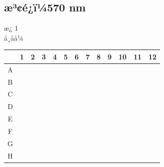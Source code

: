 \documentclass[UTF8,10pt,a4paper,fontset=fandol]{ctexart}
\begin{document}
\subsection*{æ³¢é¿ï¼570 nm}

\noindent
æ¿ 1\\
å¸åå¼

\begin{center}
\scriptsize
\begin{tabular}{c|*{12}{p{0.52cm}|}}
 & 1 & 2 & 3 & 4 & 5 & 6 & 7 & 8 & 9 & 10 & 11 & 12\\ \hline
A & & & &
\parbox[t]{0.5cm}{} &
\parbox[t]{0.5cm}{} &
\parbox[t]{0.5cm}{} &
\parbox[t]{0.5cm}{} &
\parbox[t]{0.5cm}{} &
\parbox[t]{0.5cm}{} &
& & \\ \hline
B & & & &
\parbox[t]{0.5cm}{} &
\parbox[t]{0.5cm}{} &
\parbox[t]{0.5cm}{} &
\parbox[t]{0.5cm}{} &
\parbox[t]{0.5cm}{} &
\parbox[t]{0.5cm}{} &
& & \\ \hline
C & & & &
\parbox[t]{0.5cm}{} &
\parbox[t]{0.5cm}{} &
\parbox[t]{0.5cm}{} &
\parbox[t]{0.5cm}{} &
\parbox[t]{0.5cm}{} &
\parbox[t]{0.5cm}{} &
& & \\ \hline
D & & & &
\parbox[t]{0.5cm}{} &
\parbox[t]{0.5cm}{} &
\parbox[t]{0.5cm}{} &
\parbox[t]{0.5cm}{} &
\parbox[t]{0.5cm}{} &
\parbox[t]{0.5cm}{} &
& & \\ \hline
E & & & &
\parbox[t]{0.5cm}{} &
\parbox[t]{0.5cm}{} &
\parbox[t]{0.5cm}{} &
\parbox[t]{0.5cm}{} &
\parbox[t]{0.5cm}{} &
\parbox[t]{0.5cm}{} &
& & \\ \hline
F & & & &
\parbox[t]{0.5cm}{} &
\parbox[t]{0.5cm}{} &
\parbox[t]{0.5cm}{} &
\parbox[t]{0.5cm}{} &
\parbox[t]{0.5cm}{} &
\parbox[t]{0.5cm}{} &
& & \\ \hline
G & & & &
\parbox[t]{0.5cm}{} &
\parbox[t]{0.5cm}{} &
\parbox[t]{0.5cm}{} &
\parbox[t]{0.5cm}{} &
\parbox[t]{0.5cm}{} &
\parbox[t]{0.5cm}{} &
& & \\ \hline
H & & & &
\parbox[t]{0.5cm}{} &
\parbox[t]{0.5cm}{} &
\parbox[t]{0.5cm}{} &
\parbox[t]{0.5cm}{} &
\parbox[t]{0.5cm}{} &
\parbox[t]{0.5cm}{} &
& & \\ \hline
\end{tabular}
\end{center}
\end{document}
